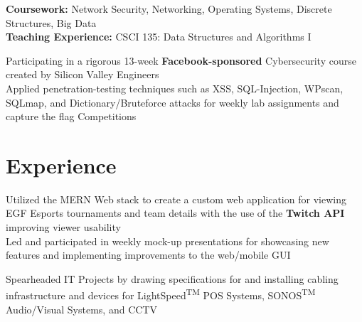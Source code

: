 \documentclass[a4paper]{Resume}
\begin{document}
\begin{onehalfspace}


\pt \textbf{Coursework:} Network Security, Networking, Operating Systems, Discrete Structures, Big Data   \\
\pt \textbf{Teaching Experience:} CSCI 135: Data Structures and Algorithms I  
\sectionsep


\pt Participating in a rigorous 13-week \textbf{Facebook-sponsored} Cybersecurity course created by Silicon Valley Engineers  \\
\pt Applied penetration-testing techniques such as XSS, SQL-Injection, WPscan, SQLmap, and Dictionary/Bruteforce attacks for weekly lab assignments and capture the flag Competitions
\sectionsep



\sectionsep


\section{Experience} 
\hrulefill 


\pt Utilized the MERN Web stack to create a custom web application for viewing EGF Esports tournaments and team details with the use of the \textbf{Twitch API} improving viewer usability \\

\pt Led and participated in weekly mock-up presentations for showcasing new features and implementing improvements to the web/mobile GUI  \\

\sectionsep


\pt Spearheaded IT Projects by drawing specifications for and installing cabling infrastructure and devices for LightSpeed\textsuperscript{TM} POS Systems,  SONOS\textsuperscript{TM} Audio/Visual Systems, and CCTV \\


\end{onehalfspace}
\end{document}
